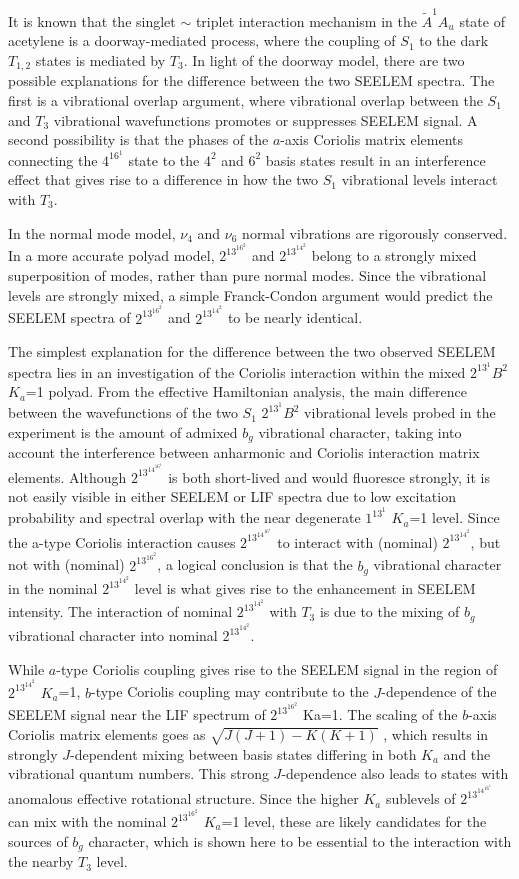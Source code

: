 \documentclass[12pt]{mitthesis}
\begin{document}
It is known that the singlet $\sim$ triplet interaction mechanism in
the $\tilde{A}^1A_u$ state of acetylene is a doorway-mediated process,
where the coupling of $S_1$ to the dark $T_{1,2}$ states is mediated
by $T_3$.  In light of the doorway model, there are two possible
explanations for the difference between the two SEELEM spectra. The
first is a vibrational overlap argument, where vibrational overlap
between the $S_1$ and $T_3$ vibrational wavefunctions promotes or
suppresses SEELEM signal. A second possibility is that the phases of
the $a$-axis Coriolis matrix elements connecting the $4^16^1$ state to
the $4^2$ and $6^2$ basis states result in an interference effect that
gives rise to a difference in how the two $S_1$ vibrational levels
interact with $T_3$.

In the normal mode model, $\nu_4$ and $\nu_6$ normal vibrations are
rigorously conserved. In a more accurate polyad model, $2^13^16^2$ and
$2^13^14^2$ belong to a strongly mixed superposition of modes, rather
than pure normal modes. Since the vibrational levels are strongly
mixed, a simple Franck-Condon argument would predict the SEELEM
spectra of $2^13^16^2$ and $2^13^14^2$ to be nearly identical.

The simplest explanation for the difference between the two observed
SEELEM spectra lies in an investigation of the Coriolis interaction
within the mixed $2^13^1B^2$ $K_a$=1 polyad. From the effective
Hamiltonian analysis, the main difference between the wavefunctions of
the two $S_1$ $2^13^1B^2$ vibrational levels probed in the experiment
is the amount of admixed $b_g$ vibrational character, taking into account
the interference between anharmonic and Coriolis interaction matrix
elements. Although $2^13^14^16^1$ is both short-lived and would
fluoresce strongly, it is not easily visible in either SEELEM or LIF
spectra due to low excitation probability and spectral overlap with
the near degenerate $1^13^1$ $K_a$=1 level. Since the a-type Coriolis
interaction causes $2^13^14^16^1$ to interact with (nominal)
$2^13^14^2$, but not with (nominal) $2^13^16^2$, a logical conclusion
is that the $b_g$ vibrational character in the nominal $2^13^14^2$ level
is what gives rise to the enhancement in SEELEM intensity. The
interaction of nominal $2^13^14^2$ with $T_3$ is due to the mixing of
$b_g$ vibrational character into nominal $2^13^14^2$.

While $a$-type Coriolis coupling gives rise to the SEELEM signal in the
region of $2^13^14^2$ $K_a$=1, $b$-type Coriolis coupling may
contribute to the $J$-dependence of the SEELEM signal near the LIF
spectrum of $2^13^16^2$ Ka=1.  The scaling of the $b$-axis Coriolis
matrix elements goes as $\sqrt{J(J+1)-K(K+1)}$ , which results in strongly
$J$-dependent mixing between basis states differing in both $K_a$ and
the vibrational quantum numbers. This strong $J$-dependence also leads
to states with anomalous effective rotational structure. Since the
higher $K_a$ sublevels of $2^13^14^16^1$ can mix with the nominal
$2^13^16^2$ $K_a$=1 level, these are likely candidates for the sources
of $b_g$ character, which is shown here to be essential to the
interaction with the nearby $T_3$ level.
\end{document}
